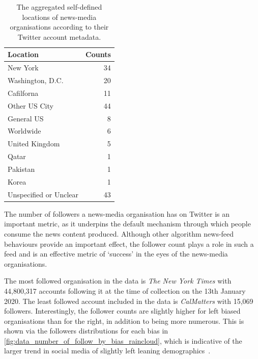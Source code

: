 \begin{table}[h!]
	\centering
	\begin{tabular}{lr}
		\toprule
		Location &  Counts \\
		\midrule
		New York &      34 \\
		Washington, D.C. &      20 \\
		Cafilforna &      11 \\
		Other US City &      44 \\
		General US &       8 \\
		Worldwide &       6 \\
		United Kingdom &       5 \\
		Qatar &       1 \\
		Pakistan &       1 \\
		Korea  &       1 \\
		Unspecified or Unclear &      43 \\
		\bottomrule
	\end{tabular}
	\caption{The aggregated self-defined locations of news-media organisations according to their Twitter account metadata. }
	\label{tab:data_locations}
\end{table}

The number of followers a news-media organisation has on Twitter is an important metric, as it underpins the default mechanism through which people consume the news content produced. Although other algorithm news-feed behaviours provide an important effect, the follower count plays a role in such a feed and is an effective metric of `success' in the eyes of the news-media organisations.

The most followed organisation in the data is \emph{The New York Times} with 44,800,317 accounts following it at the time of collection on the 13th January 2020. The least followed account included in the data is \emph{CalMatters} with 15,069 followers. Interestingly, the follower counts are slightly higher for left biased organisations than for the right, in addition to being more numerous. This is shown via the followers distributions for each bias in \autoref{fig:data_number_of_follow_by_bias_raincloud}, which is indicative of the larger trend in social media of slightly left leaning demographics~\cite{mellon_twitter_2017}.

